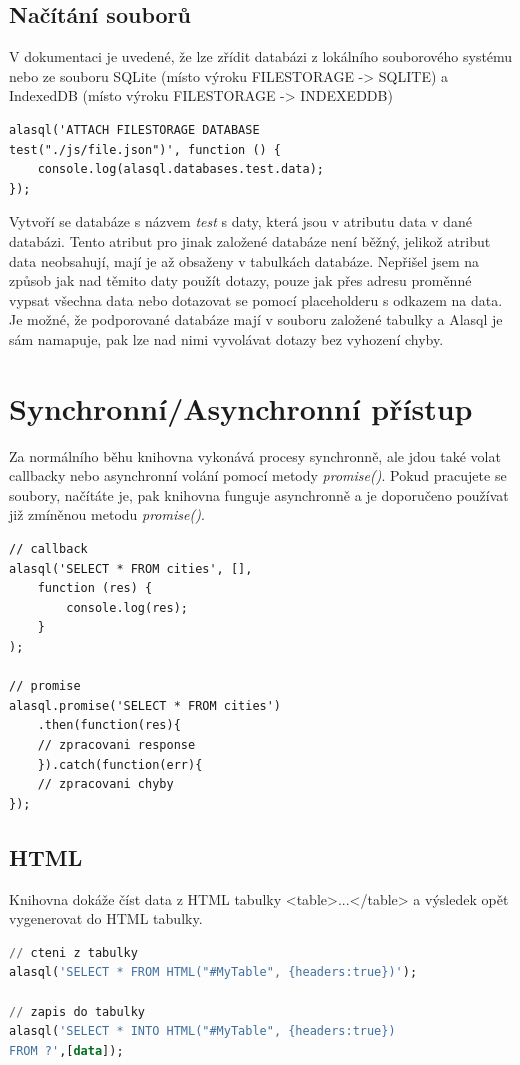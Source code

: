 \documentclass[a4, titlepage]{article}
\begin{document}
\subsection{Načítání souborů}
V dokumentaci je uvedené, že lze zřídit databázi z lokálního souborového systému nebo ze souboru SQLite (místo výroku FILESTORAGE -> SQLITE) a IndexedDB (místo výroku FILESTORAGE -> INDEXEDDB)
\begin{lstlisting}
alasql('ATTACH FILESTORAGE DATABASE 
test("./js/file.json")', function () {
    console.log(alasql.databases.test.data);
});
\end{lstlisting}
Vytvoří se databáze s názvem \textit{test} s daty, která jsou v atributu data v dané databázi. Tento atribut pro jinak založené databáze není běžný, jelikož atribut data neobsahují, mají je až obsaženy v tabulkách databáze. Nepřišel jsem na způsob jak nad těmito daty použít dotazy, pouze jak přes adresu proměnné vypsat všechna data nebo dotazovat se pomocí placeholderu s odkazem na data.
Je možné, že podporované databáze mají v souboru založené tabulky a Alasql je sám namapuje, pak lze nad nimi vyvolávat dotazy bez vyhození chyby.

\section{Synchronní/Asynchronní přístup}
Za normálního běhu knihovna vykonává procesy synchronně, ale jdou také volat callbacky nebo asynchronní volání pomocí metody \textit{promise()}. Pokud pracujete se soubory, načítáte je, pak knihovna funguje asynchronně a je doporučeno používat již zmíněnou metodu \textit{promise()}.

\begin{lstlisting}
// callback
alasql('SELECT * FROM cities', [],
    function (res) {
        console.log(res);
    }
);

// promise
alasql.promise('SELECT * FROM cities')
    .then(function(res){
    // zpracovani response
    }).catch(function(err){
    // zpracovani chyby
});
\end{lstlisting}

\subsection{HTML}
Knihovna dokáže číst data z HTML tabulky <table>...</table> a výsledek opět vygenerovat do HTML tabulky.
\begin{lstlisting}[language=SQL]
// cteni z tabulky
alasql('SELECT * FROM HTML("#MyTable", {headers:true})');

// zapis do tabulky
alasql('SELECT * INTO HTML("#MyTable", {headers:true}) 
FROM ?',[data]);
\end{lstlisting}
\end{document}
